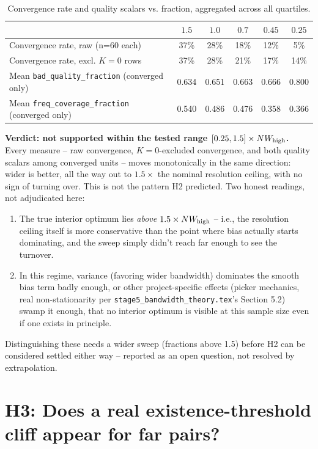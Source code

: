 \documentclass[11pt]{article}
\begin{document}
\begin{table}[h]
\centering
\begin{tabular}{lccccc}
\toprule
& $1.5$ & $1.0$ & $0.7$ & $0.45$ & $0.25$ \\
\midrule
Convergence rate, raw (n=60 each) & 37\% & 28\% & 18\% & 12\% & 5\% \\
Convergence rate, excl. $K=0$ rows & 37\% & 28\% & 21\% & 17\% & 14\% \\
Mean \texttt{bad\_quality\_fraction} (converged only) & 0.634 & 0.651 & 0.663 & 0.666 & 0.800 \\
Mean \texttt{freq\_coverage\_fraction} (converged only) & 0.540 & 0.486 & 0.476 & 0.358 & 0.366 \\
\bottomrule
\end{tabular}
\caption{Convergence rate and quality scalars vs. fraction, aggregated across all quartiles.}
\label{tab:h2}
\end{table}

\textbf{Verdict: not supported within the tested range $[0.25, 1.5]\times NW_{\rm high}$.} Every
measure -- raw convergence, $K=0$-excluded convergence, and both quality scalars among converged
units -- moves monotonically in the same direction: wider is better, all the way out to
$1.5\times$ the nominal resolution ceiling, with no sign of turning over. This is not the pattern
H2 predicted. Two honest readings, not adjudicated here:
\begin{enumerate}[nosep]
  \item The true interior optimum lies \emph{above} $1.5\times NW_{\rm high}$ -- i.e., the
    resolution ceiling itself is more conservative than the point where bias actually starts
    dominating, and the sweep simply didn't reach far enough to see the turnover.
  \item In this regime, variance (favoring wider bandwidth) dominates the smooth bias term badly
    enough, or other project-specific effects (picker mechanics, real non-stationarity per
    \texttt{stage5\_bandwidth\_theory.tex}'s Section 5.2) swamp it enough, that no interior
    optimum is visible at this sample size even if one exists in principle.
\end{enumerate}
Distinguishing these needs a wider sweep (fractions above 1.5) before H2 can be considered settled
either way -- reported as an open question, not resolved by extrapolation.

\section{H3: Does a real existence-threshold cliff appear for far pairs?}
\end{document}
